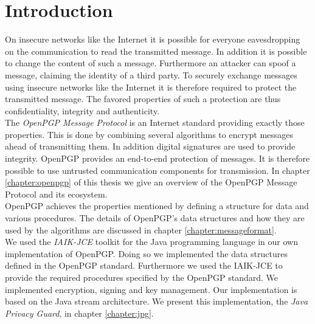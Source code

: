 \chapter{Introduction}



On insecure networks like the Internet it is possible for everyone eavesdropping on the communication to read the transmitted message. In addition it is possible to change the content of such a message. Furthermore an attacker can spoof a message, claiming the identity of a third party.
To securely exchange messages using insecure networks like the Internet it is therefore required to protect the transmitted message. The favored properties of such a protection are thus confidentiality, integrity and authenticity. \\


The \textit{OpenPGP Message Protocol} is an Internet standard providing exactly those properties.  This is done by combining several algorithms to encrypt messages ahead of transmitting them. In addition digital signatures are used to provide integrity. OpenPGP provides an end-to-end protection of messages. It is therefore possible to use untrusted communication components for transmission.
In chapter \ref{chapter:openpgp} of this thesis we give an overview of the OpenPGP Message Protocol and its ecosystem. \\

OpenPGP achieves the properties mentioned by defining a structure for data and various procedures. The details of OpenPGP's data structures and how they are used by the algorithms are discussed in chapter \ref{chapter:messageformat}. \\


We used the \textit{IAIK-JCE} toolkit for the Java programming language in our own implementation of OpenPGP. Doing so we implemented the data structures defined in the OpenPGP standard. Furthermore we used the IAIK-JCE to provide the required procedures specified by the OpenPGP standard. We implemented encryption, signing and key management. Our implementation is based on the Java stream architecture. We present this implementation, the \textit{Java Privacy Guard}, in chapter \ref{chapter:jpg}. \\

